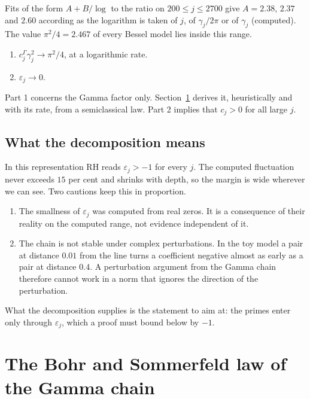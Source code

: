 Fits of the form $A+B/\log$ to the ratio on $200\le j\le2700$ give $A=2.38$, $2.37$ and $2.60$ according as the logarithm is taken of $j$, of $\gamma_j/2\pi$ or of $\gamma_j$ (computed). The value $\pi^2/4=2.467$ of every Bessel model lies inside this range.

\begin{conjecture}\label{b:conj:law}
\begin{enumerate}
\item $c_j^\Gamma\gamma_j^2\to\pi^2/4$, at a logarithmic rate.
\item $\varepsilon_j\to0$.
\end{enumerate}
\end{conjecture}

Part 1 concerns the Gamma factor only. Section~\ref{b:sec:bs} derives it, heuristically and with its rate, from a semiclassical law. Part 2 implies that $c_j>0$ for all large $j$.

\subsection{What the decomposition means}

In this representation RH reads $\varepsilon_j>-1$ for every $j$. The computed fluctuation never exceeds $15$ per cent and shrinks with depth, so the margin is wide wherever we can see. Two cautions keep this in proportion.

\begin{enumerate}
\item The smallness of $\varepsilon_j$ was computed from real zeros. It is a consequence of their reality on the computed range, not evidence independent of it.
\item The chain is not stable under complex perturbations. In the toy model a pair at distance $0.01$ from the line turns a coefficient negative almost as early as a pair at distance $0.4$. A perturbation argument from the Gamma chain therefore cannot work in a norm that ignores the direction of the perturbation.
\end{enumerate}
What the decomposition supplies is the statement to aim at: the primes enter only through $\varepsilon_j$, which a proof must bound below by $-1$.

\section{The Bohr and Sommerfeld law of the Gamma chain}\label{b:sec:bs}

